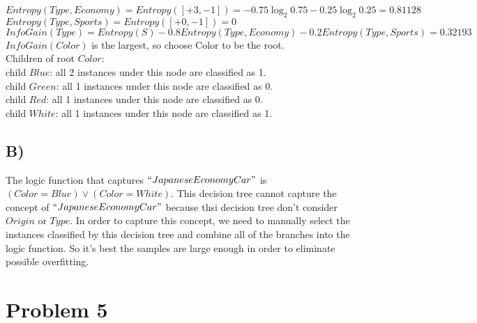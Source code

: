 \documentclass[11pt]{article}
\begin{document}
\noindent $Entropy(Type, Economy)=Entropy([+3,-1])=-0.75\log_2 0.75-0.25\log_2 0.25=0.81128$\\
$Entropy(Type, Sports)=Entropy([+0,-1])=0$\\
$InfoGain(Type)=Entropy(S)-0.8Entropy(Type, Economy)-0.2Entropy(Type, Sports)=0.32193$\\

\noindent $InfoGain(Color)$ is the largest, so choose Color to be the root.\\

\noindent Children of root $Color$:\\
child $Blue$: all 2 instances under this node are classified as 1.\\
child $Green$: all 1 instances under this node are classified as 0.\\
child $Red$: all 1 instances under this node are classified as 0.\\
child $White$: all 1 instances under this node are classified as 1.

\subsection*{B)}
The logic function that captures $``Japanese Economy Car"$ is $(Color=Blue) \vee (Color=White)$.
This decision tree cannot capture the concept of $``Japanese Economy Car"$ because thsi decision tree don't consider $Origin$ or $Type$. In order to capture this concept, we need to manually select the instances classified by this decision tree and combine all of the branches into the logic function. So it's best the samples are large enough in order to eliminate possible overfitting.

\section*{Problem 5}
\end{document}
